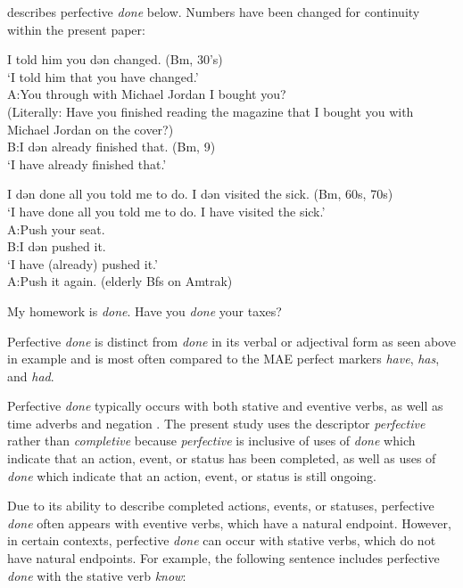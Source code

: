 \documentclass[output=paper,draftmode,colorlinks,citecolor=brown]{langscibook}
\begin{document}
\citet{Green2002} describes perfective \textit{done} below. Numbers have been changed for continuity within the present paper:


\ea
\ea
I told him you dən changed. (Bm, 30’s)\\
\glt ‘I told him that you have changed.’\\
A:\quad You through with Michael Jordan I bought you? \\
(Literally: Have you finished reading the magazine that I bought you with Michael Jordan on the cover?)\\
B:\quad I dən already finished that. (Bm, 9)\\
\glt ‘I have already finished that.’

\ex I dən done all you told me to do. I dən visited the sick. (Bm, 60s, 70s) \\
‘I have done all you told me to do. I have visited the sick.’\\
\ex
A:\quad Push your seat.\\
B:\quad I dən pushed it.\\
\glt ‘I have (already) pushed it.’ \\
A:\quad Push it again. (elderly Bfs on Amtrak)\\
\citep[60]{Green2002}
\z
\z

\ea \label{ex:baxter:8}
\ea My homework is \textit{done}.
\ex Have you \textit{done} your taxes?
\z
\z

Perfective \textit{done} is distinct from \textit{done} in its verbal or adjectival form as seen above in example  and is most often compared to the MAE perfect markers \textit{have}, \textit{has}, and \textit{had}.

Perfective \textit{done} typically occurs with both stative and eventive verbs, as well as time adverbs and negation \citep{Martin2018}. The present study uses the descriptor \textit{perfective} rather than \textit{completive} because \textit{perfective} is inclusive of uses of \textit{done} which indicate that an action, event, or status has been completed, as well as uses of \textit{done} which indicate that an action, event, or status is still ongoing.

Due to its ability to describe completed actions, events, or statuses, perfective \textit{done} often appears with eventive verbs, which have a natural endpoint. However, in certain contexts, perfective \textit{done} can occur with stative verbs, which do not have natural endpoints. For example, the following sentence includes perfective \textit{done} with the stative verb \textit{know}:
\end{document}
